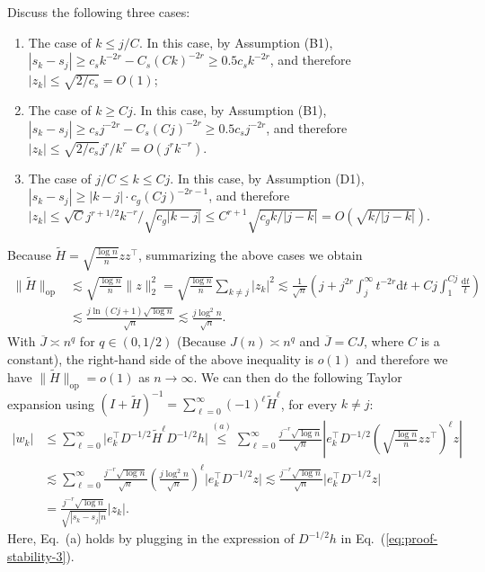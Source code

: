 \documentclass[11pt,a4paper]{article}
\renewcommand{\tilde}{\widetilde}
\renewcommand{\bar}{\overline}
\theoremstyle{definition}
\theoremstyle{plain}
\theoremstyle{remark}
\newcommand{\op}{\mathrm{op}}
\newcommand{\ud}{\mathrm d}
\begin{document}
Discuss the following three cases:
\begin{enumerate}
\item The case of $k\leq j/C$. In this case, by Assumption (B1), $|s_k-s_j|\geq c_s k^{-2r} - C_s(Ck)^{-2r}\geq 0.5c_sk^{-2r}$, and therefore $|z_k|\leq \sqrt{2/c_s}=O(1)$;
\item The case of $k\geq Cj$. In this case, by Assumption (B1), $|s_k-s_j| \geq c_s j^{-2r} - C_s (Cj)^{-2r}\geq 0.5c_s j^{-2r}$, and therefore $|z_k|\leq \sqrt{2/c_s}j^r/k^r= O(j^rk^{-r})$.
\item The case of $j/C\leq k\leq Cj$. In this case, by Assumption (D1), $|s_k-s_j| \geq |k-j| \cdot c_g(Cj)^{-2r-1}$, and therefore $|z_k|\leq \sqrt{C}j^{r+1/2}k^{-r}/\sqrt{c_g|k-j|}\leq C^{r+1}\sqrt{c_gk/|j-k|}= O(\sqrt{k/|j-k|})$.
\end{enumerate}
Because $\tilde H=\sqrt{\frac{\log n}{n}}zz^\top$, summarizing the above cases we obtain 
\begin{align}
\|\tilde H\|_\op&\lesssim \sqrt{\frac{\log n}{n}}\|z\|_2^2 =\sqrt{\frac{\log n}{n}}\sum_{k\neq j}|z_k|^2  \lesssim \frac{1}{\sqrt{n}}\left(j + j^{2r}\int_j^{\infty}t^{-2r}\ud t + Cj\int_1^{Cj} \frac{\ud t}{t}\right)\nonumber\\
& \lesssim \frac{j\ln (Cj+1)\sqrt{\log n}}{\sqrt{n}}\lesssim \frac{j\log^2 n}{\sqrt{n}}.
\end{align}
With $\bar J\asymp n^q$ for $q\in(0,1/2)$ (Because $J(n)\asymp n^q$ and $\bar J=CJ$, where $C$ is a constant), the right-hand side of the above inequality is $o(1)$ and therefore we have $\|\tilde H\|_\op=o(1)$ as $n\to\infty$.
We can then do the following Taylor expansion using $(I+\tilde H)^{-1} = \sum_{\ell=0}^{\infty} (-1)^\ell \tilde H^\ell$, for every $k\neq j$:
\begin{align}
|w_k| &\leq \sum_{\ell=0}^{\infty} \big|e_k^\top D^{-1/2}\tilde H^\ell D^{-1/2}h\big| \overset{(a)}{\leq }\sum_{\ell=0}^{\infty} \frac{j^{-r}\sqrt{\log n}}{\sqrt{n}}\left|e_k^\top D^{-1/2}\left(\sqrt{\frac{\log n}{n}}zz^\top\right)^\ell z\right|\nonumber\\
&\lesssim \sum_{\ell=0}^{\infty}\frac{j^{-r}\sqrt{\log n}}{\sqrt{n}}\left(\frac{j\log^2 n}{\sqrt{n}}\right)^\ell \big|e_k^\top D^{-1/2}z\big| \lesssim \frac{j^{-r}\sqrt{\log n}}{\sqrt{n}}\big|e_k^\top D^{-1/2}z\big|\nonumber\\
& = \frac{j^{-r}\sqrt{\log n}}{\sqrt{|s_k-s_j| n}}\big|z_k\big|.\label{eq:proof-stability-4} 
\end{align}
Here, Eq.~(a) holds by plugging in the expression of $D^{-1/2}h$ in Eq.~(\ref{eq:proof-stability-3}).
\end{document}
